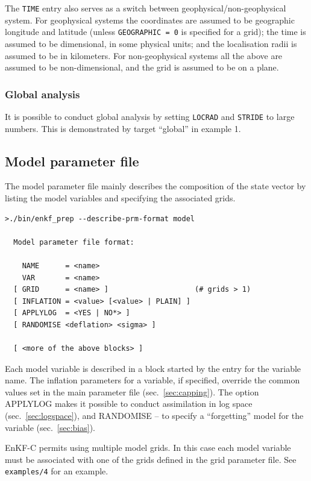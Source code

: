 \documentclass[11pt]{report}
\begin{document}
The \verb|TIME| entry also serves as a switch between geophysical/non-geophysical system.
For geophysical systems the coordinates are assumed to be geographic longitude and latitude (unless \verb|GEOGRAPHIC = 0| is specified for a grid); the time is assumed to be dimensional, in some physical units; and the localisation radii is assumed to be in kilometers.
For non-geophysical systems all the above are assumed to be non-dimensional, and the grid is assumed to be on a plane.

\subsubsection{Global analysis}

It is possible to conduct global analysis by setting \verb|LOCRAD| and \verb|STRIDE| to large numbers.
This is demonstrated by target ``global'' in example 1.

\subsection{Model parameter file}
\label{sec:modelprm}

The model parameter file mainly describes the composition of the state vector by listing the model variables and specifying the associated grids.

\begin{Verbatim}[frame=single,fontsize=\footnotesize]
>./bin/enkf_prep --describe-prm-format model

  Model parameter file format:

    NAME      = <name>
    VAR       = <name>
  [ GRID      = <name> ]                    (# grids > 1)
  [ INFLATION = <value> [<value> | PLAIN] ]
  [ APPLYLOG  = <YES | NO*> ]
  [ RANDOMISE <deflation> <sigma> ]

  [ <more of the above blocks> ]
\end{Verbatim}

Each model variable is described in a block started by the entry for the variable name.
The inflation parameters for a variable, if specified, override the common values set in the main parameter file (sec.~\ref{sec:capping}).
The option APPLYLOG makes it possible to conduct assimilation in log space (sec.~\ref{sec:logspace}), and RANDOMISE -- to specify a ``forgetting'' model for the variable (sec.~\ref{sec:bias}).

EnKF-C permits using multiple model grids.
In this case each model variable must be associated with one of the grids defined in the grid parameter file.
See \verb|examples/4| for an example.
\end{document}
